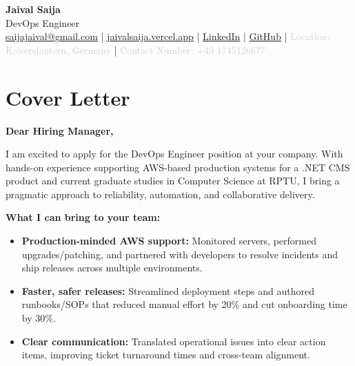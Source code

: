 \documentclass[11pt,a4paper]{article}
\newcommand{\dotnet}{\mbox{.NET}}
\begin{document}
\frenchspacing
{}
\setlength{\emergencystretch}{6em}
\sloppy

\begin{center}
\begin{minipage}{0.92\textwidth}
\centering
    {\Huge\bfseries Jaival Saija}\\[0.5pt]
    {\large DevOps Engineer}\\[2pt]
    {\small
    \href{mailto:saijajaival@gmail.com}{saijajaival@gmail.com} \quad | \quad
    \href{https://jaivalsaija.vercel.app}{jaivalsaija.vercel.app} \quad | \quad
    \href{https://linkedin.com/in/jaivalsaija}{LinkedIn} \quad | \quad
    \href{https://github.com/Jaival}{GitHub} \quad | \quad
    \textcolor{lightgray}{Location: Kaiserslautern, Germany} \quad | \quad
    \textcolor{lightgray}{Contact Number: +49 1745126677}
    }
\end{minipage}
\end{center}

\vspace{4pt}

\section*{Cover Letter}

\textbf{Dear Hiring Manager,}

I am excited to apply for the DevOps Engineer position at your company. With hands-on experience supporting AWS-based production systems for a {\dotnet} CMS product and current graduate studies in Computer Science at RPTU, I bring a pragmatic approach to reliability, automation, and collaborative delivery.

\textbf{What I can bring to your team:}
\begin{itemize}[leftmargin=*, topsep=0pt, itemsep=0pt, parsep=0pt, partopsep=0pt]
    \item \textbf{Production-minded AWS support:} Monitored servers, performed upgrades/patching, and partnered with developers to resolve incidents and ship releases across multiple environments.
    \item \textbf{Faster, safer releases:} Streamlined deployment steps and authored runbooks/SOPs that reduced manual effort by 20\% and cut onboarding time by 30\%.
    \item \textbf{Clear communication:} Translated operational issues into clear action items, improving ticket turnaround times and cross-team alignment.
\end{itemize}
\end{document}
